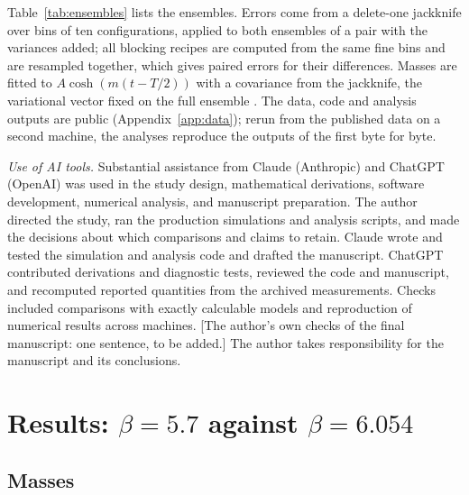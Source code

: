 \documentclass[11pt]{article}
\begin{document}
Table~\ref{tab:ensembles} lists the ensembles. Errors come from a delete-one jackknife over bins of ten
configurations, applied to both ensembles of a pair with the variances added; all blocking recipes are
computed from the same fine bins and are resampled together, which gives paired errors for their
differences. Masses are fitted to $A\cosh(m(t-T/2))$ with a covariance from the jackknife, the
variational vector fixed on the full ensemble \cite{Michael1985,LuscherWolff1990,Blossier2009}. The data,
code and analysis outputs are public (Appendix~\ref{app:data}); rerun from the published data on a second
machine, the analyses reproduce the outputs of the first byte for byte.

\emph{Use of AI tools.} Substantial assistance from Claude (Anthropic) and ChatGPT (OpenAI) was used in
the study design, mathematical derivations, software development, numerical analysis, and manuscript
preparation. The author directed the study, ran the production simulations and analysis scripts, and
made the decisions about which comparisons and claims to retain. Claude wrote and tested the simulation
and analysis code and drafted the manuscript. ChatGPT contributed derivations and diagnostic tests,
reviewed the code and manuscript, and recomputed reported quantities from the archived measurements.
Checks included comparisons with exactly calculable models and reproduction of numerical results across
machines. [The author's own checks of the final manuscript: one sentence, to be added.] The author takes
responsibility for the manuscript and its conclusions.

\section{Results: \texorpdfstring{$\beta=5.7$}{beta = 5.7} against \texorpdfstring{$\beta=6.054$}{beta = 6.054}}\label{sec:pair1}

\subsection{Masses}
\end{document}
